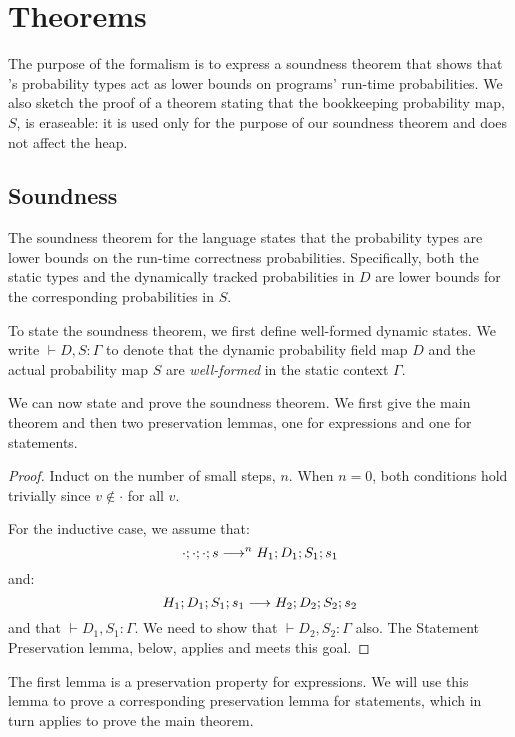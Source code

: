 {\section{Theorems}

The purpose of the formalism is to express a soundness theorem that shows that
\lang's probability types act as lower bounds on programs' run-time
probabilities.
We also sketch the proof of a theorem stating that the bookkeeping probability map, $S$,
is eraseable: it is used only for the purpose of our soundness theorem and
does not affect the heap.

\subsection{Soundness}

The soundness theorem for the language states that the probability types are
lower bounds on the run-time correctness probabilities.
Specifically, both the static types  and the dynamically tracked
probabilities in $D$ are lower bounds for the corresponding probabilities in
$S$.

To state the soundness theorem, we first define well-formed dynamic states.
We write
$\vdash D, S : \Gamma$
to denote that the dynamic probability field map $D$
and the actual probability map $S$
are \emph{well-formed} in the static context $\Gamma$.



We can now state and prove the soundness theorem. We first give the main
theorem and then two
preservation lemmas, one for expressions and one for statements.



\begin{proof}
Induct on the number of small steps, $n$.
When $n = 0$, both conditions hold trivially since $v \notin \cdot$ for all
$v$.

For the inductive case, we assume that:
$$\cdot ; \cdot ; \cdot ; s \longrightarrow^n
H_1 ; D_1; S_1; s_1$$
and:
$$H_1 ; D_1 ; S_1 ; s_1 \longrightarrow
H_2 ; D_2 ; S_2 ; s_2$$
and that
$\vdash D_1, S_1 : \Gamma$.
We need to show that
$\vdash D_2, S_2 : \Gamma$ also.
The Statement Preservation lemma, below, applies and meets this goal.
\end{proof}

The first lemma is a preservation property for expressions. We will use this
lemma to prove a corresponding preservation lemma for statements, which in turn applies to
prove the main theorem.

}
